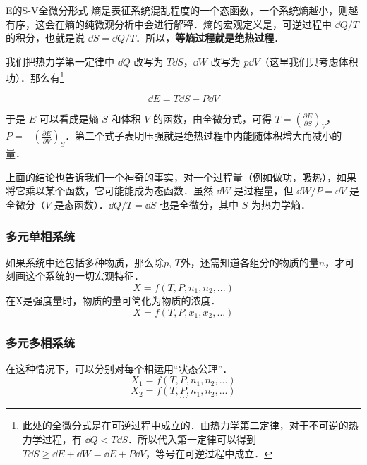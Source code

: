 \begin{example}{E的S-V全微分形式}
熵是表征系统混乱程度的一个态函数，一个系统熵越小，则越有序，这会在熵的纯微观分析中会进行解释．熵的宏观定义是，可逆过程中 $\dd Q/T$ 的积分，也就是说 $\dd S=\dd Q/T$．所以，\textbf{等熵过程就是绝热过程}．

我们把热力学第一定律中 $\dd Q$ 改写为 $T\dd S$，$\dd W$ 改写为 $p\dd V$（这里我们只考虑体积功）．那么有\footnote{
此处的全微分式是在可逆过程中成立的．由热力学第二定律，对于不可逆的热力学过程，有 $\dd Q<T\dd S$．所以代入第一定律可以得到 $T\dd S\ge \dd E+\dd W=\dd E+P\dd V$，等号在可逆过程中成立．
}

\begin{equation}
\dd E=T\dd S-P\dd V
\end{equation}

于是 $E$ 可以看成是熵 $S$ 和体积 $V$ 的函数，由全微分式，可得 $T=\left(\frac{\partial E}{\partial S}\right)_V$，$P=-\left(\frac{\partial E}{\partial V}\right)_S$．第二个式子表明压强就是绝热过程中内能随体积增大而减小的量．

上面的结论也告诉我们一个神奇的事实，对一个过程量（例如做功，吸热），如果将它乘以某个函数，它可能能成为态函数．虽然 $\dd W$ 是过程量，但 $\dd W/P=\dd V$ 是全微分（$V$ 是态函数）．$\dd Q/T=\dd S$ 也是全微分，其中 $S$ 为热力学熵．
\end{example}

\subsubsection{多元单相系统}
如果系统中还包括多种物质，那么除$p$, $T$外，还需知道各组分的物质的量$n$，才可刻画这个系统的一切宏观特征．
\begin{equation}
X=f(T,P,n_1, n_2, ...)
\end{equation}
在X是强度量时，物质的量可简化为物质的浓度．
\begin{equation}
X=f(T,P,x_1, x_2, ...)
\end{equation}

\subsubsection{多元多相系统}
在这种情况下，可以分别对每个相运用“状态公理”．
\begin{equation}
X_1=f(T,P,n_1, n_2, ...)
\end{equation}
\begin{equation}
X_2=f(T,P,n_1, n_2, ...)
\end{equation}
$$...$$
